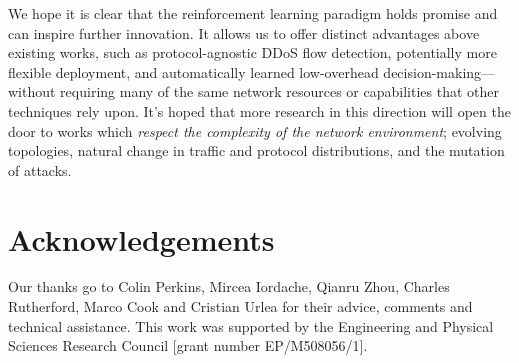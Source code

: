 \documentclass[10pt, times, comsoc]{IEEEtran}
\begin{document}
We hope it is clear that the reinforcement learning paradigm holds promise and can inspire further innovation.
It allows us to offer distinct advantages above existing works, such as protocol-agnostic DDoS flow detection, potentially more flexible deployment, and automatically learned low-overhead decision-making---without requiring many of the same network resources or capabilities that other techniques rely upon.
It's hoped that more research in this direction will open the door to works which \emph{respect the complexity of the network environment}; evolving topologies, natural change in traffic and protocol distributions, and the mutation of attacks.

\section*{Acknowledgements}
Our thanks go to Colin Perkins, Mircea Iordache, Qianru Zhou, Charles Rutherford, Marco Cook and Cristian Urlea for their advice, comments and technical assistance.
This work was supported by the Engineering and Physical Sciences Research Council [grant number EP/M508056/1].
\end{document}
